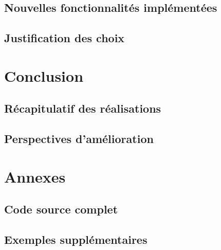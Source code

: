 \documentclass{article}
\begin{document}
\subsection{Nouvelles fonctionnalités implémentées}
\subsection{Justification des choix}

\section{Conclusion}
\subsection{Récapitulatif des réalisations}
\subsection{Perspectives d'amélioration}

\section{Annexes}
\subsection{Code source complet}
\subsection{Exemples supplémentaires}
\end{document}
